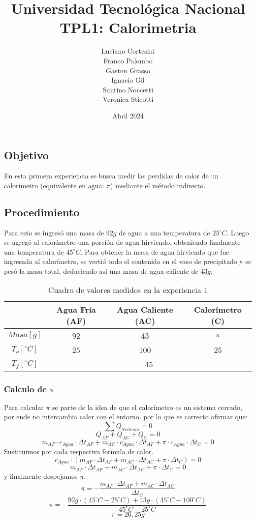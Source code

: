 \documentclass[12pt]{report}
\title{Universidad Tecnológica Nacional\\TPL1: Calorimetria}
\author{
Luciano Cortesini\\
Franco Palombo\\
Gaston Grasso\\
Ignacio Gil\\
Santino Noccetti\\
Veronica Sticotti
}
\date{Abril 2024}
\begin{document}
\maketitle

\chapter{}
\section{Objetivo}
En esta primera experiencia se busca medir las perdidas de calor de un calorímetro (equivalente en agua: $\pi$) mediante el método indirecto. 

\section{Procedimiento}
Para esto se ingresó una masa de $92 g$ de agua a una temperatura de $25^\circ C$.
Luego se agregó al calorímetro una porción de agua hirviendo, obteniendo finalmente una temperatura de  $45^\circ C$. 
Para obtener la masa de agua hirviendo que fue ingresada al calorímetro, se vertió todo el contenido en el vaso de precipitado y se pesó la masa total, deduciendo así una masa de agua caliente de $43g$.
\begin{table}[htbp]
    \centering
    \begin{tabular}{|c|c|c|c|}
    \hline
    & Agua Fría (AF) & Agua Caliente (AC) & Calorímetro (C)\\
    \hline
    $Masa[g]$ & 92 & 43 & $\pi$ \\
    \hline
   $T_o[^\circ C]$ & 25 & 100 & 25\\
    \hline
     $T_f[^\circ C]$ & \multicolumn{3}{|c|}{45}\\
    \hline
    \end{tabular}
    \caption{Cuadro de valores medidos en la experiencia 1}
    \label{tab:datos experiencia 1}
\end{table}
\subsection{Calculo de $\pi$}
Para calcular $\pi$ se parte de la idea de que el calorímetro es un sistema cerrado, por ende no intercambia calor con el entorno. por lo que es correcto afirmar que:
$$\sum Q_{Sistema}= 0$$
$$Q_{AF} + Q_{AC} + Q_{C} = 0$$
$$m_{AF} \cdot c_{Agua} \cdot {\Delta t}_{AF} + m_{AC} \cdot c_{Agua} \cdot {\Delta t}_{AF} + \pi \cdot c_{Agua} \cdot {\Delta t}_{C} = 0$$
\hspace{1cm} Sustituimos por cada respectiva formula de calor.
$$c_{Agua} \cdot (m_{AF}  \cdot {\Delta t}_{AF} + m_{AC} \cdot {\Delta t}_{AC} + \pi \cdot {\Delta t}_C) = 0$$
$$m_{AF} \cdot  {\Delta t}_{AF} + m_{AC} \cdot  {\Delta t}_{AC} + \pi \cdot {\Delta t}_C= 0$$
\hspace{1cm} y finalmente despejamos $\pi$.
$$\pi =-\frac{m_{AF} \cdot  {\Delta t}_{AF} + m_{AC} \cdot  {\Delta t}_{AC}}{{\Delta t}_C}$$
$$\pi =-\frac{92g \cdot (45^\circ C-25^\circ C)+ 43g \cdot (45^\circ C-100^\circ C)}{45^\circ C-25^\circ C}$$
$$\pi = 26,25g$$
\end{document}
